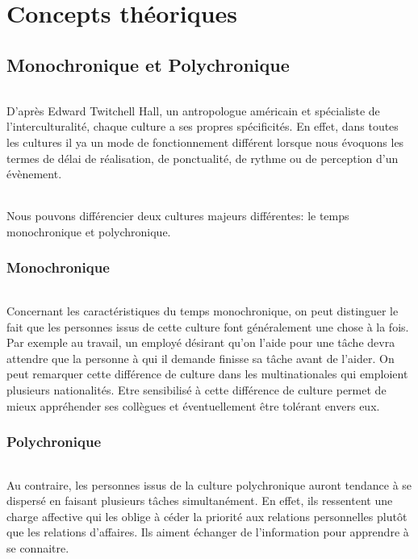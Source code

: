 \part{Concepts théoriques}

\chapter{Monochronique et Polychronique}

\paragraph{}
 D'après Edward Twitchell Hall, un antropologue américain et spécialiste de l'interculturalité, chaque culture a ses propres spécificités. En effet, dans toutes les cultures il ya un mode de fonctionnement différent lorsque nous évoquons les termes de délai de réalisation, de ponctualité, de rythme ou de perception d'un évènement.

\paragraph{} 
Nous pouvons différencier deux cultures majeurs différentes: le temps monochronique et polychronique.

\section{Monochronique}
\paragraph{} 
Concernant les caractéristiques du temps monochronique, on peut distinguer le fait que les personnes issus de cette culture font généralement une chose à la fois. Par exemple au travail, un employé désirant qu'on l'aide pour une tâche devra attendre que la personne à qui il demande finisse sa tâche avant de l'aider. On peut remarquer cette différence de culture dans les multinationales qui emploient plusieurs nationalités. Etre sensibilisé à cette différence de culture permet de mieux appréhender ses collègues et éventuellement être tolérant envers eux.

\section{Polychronique}
\paragraph{} 
Au contraire, les personnes issus de la culture polychronique auront tendance à se dispersé en faisant plusieurs tâches simultanément. En effet, ils ressentent une charge affective qui les oblige à céder la priorité aux relations personnelles plutôt que les relations d'affaires. Ils aiment échanger de l'information pour apprendre à se connaitre.

